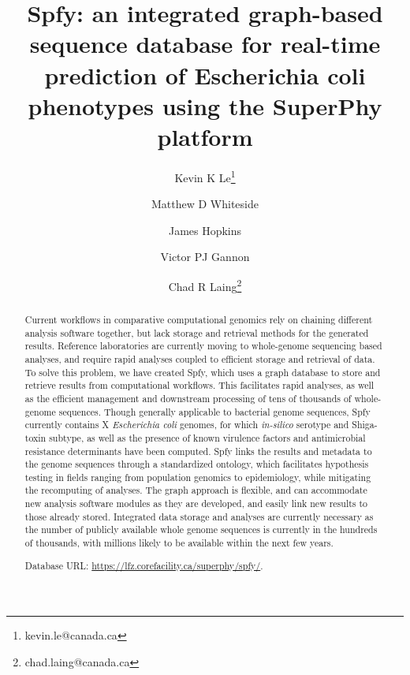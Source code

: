 \documentclass{article}
\begin{document}
\title{Spfy: an integrated graph-based sequence database for real-time prediction of Escherichia coli phenotypes using the SuperPhy platform}

\author[1]{Kevin K Le\thanks{kevin.le@canada.ca}}
\author[1]{Matthew D Whiteside}
\author[1]{James Hopkins}
\author[1]{Victor PJ Gannon}
\author[1]{Chad R Laing\thanks{chad.laing@canada.ca}}

\renewcommand\Authands{ and }

\maketitle

\begin{abstract}

Current workflows in comparative computational genomics rely on chaining different analysis software together, but lack storage and retrieval methods for the generated results. Reference laboratories are currently moving to whole-genome sequencing based analyses, and require rapid analyses coupled to efficient storage and retrieval of data. 
To solve this problem, we have created Spfy, which uses a graph database to store and retrieve results from computational workflows. This facilitates rapid analyses, as well as the efficient management and downstream processing of tens of thousands of whole-genome sequences. Though generally applicable to bacterial genome sequences, Spfy currently contains X \textit{Escherichia coli} genomes, for which \textit{in-silico} serotype and Shiga-toxin subtype, as well as the presence of known virulence factors and antimicrobial resistance determinants have been computed.
Spfy links the results and metadata to the genome sequences through a standardized ontology, which facilitates hypothesis testing in fields ranging from population genomics to epidemiology, while mitigating the recomputing of analyses.
The graph approach is flexible, and can accommodate new analysis software modules as they are developed, and easily link new results to those already stored.
Integrated data storage and analyses are currently necessary as the number of publicly available whole genome sequences is currently in the hundreds of thousands, with millions likely to be available within the next few years. \par

Database URL: \url{https://lfz.corefacility.ca/superphy/spfy/}.

\end{abstract}
\end{document}

